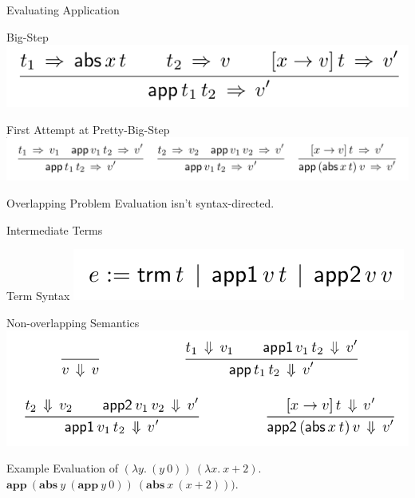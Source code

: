 \documentclass[page number,dvipsnames]{beamer}
\begin{document}
\begin{frame}{Evaluating Application}
  \begin{alertblock}{Big-Step}
    \center
    \includegraphics[scale=0.3]{bigstep_betared.png}
  \end{alertblock}
  \vfill
  \begin{block}{First Attempt at Pretty-Big-Step}
    \center
    \includegraphics[scale=0.3]{first_attempt_betared.png}
  \end{block}
  \begin{alertblock}{Overlapping Problem}
    Evaluation isn't syntax-directed.
  \end{alertblock}
\end{frame}

\begin{frame}{Intermediate Terms}
  \begin{block}{Term Syntax}
    \center
    \includegraphics[scale=0.3]{interm.png}
  \end{block}
  \vfill
  \begin{exampleblock}{Non-overlapping Semantics}
    \center
    \includegraphics[scale=0.3]{interm_step.png}
  \end{exampleblock}
\end{frame}

\def\app{\mathbf{app}}
\def\abs{\mathbf{abs}}
\begin{frame}{Example}
  Evaluation of $(\lambda y.~ (y ~0))~ (\lambda x.~ x + 2)$.\\
  $\app~(\abs~ y~ (\app~ y~ 0))~(\abs~ x~ (x+2)))$.
  \vfill
\end{frame}
\end{document}
